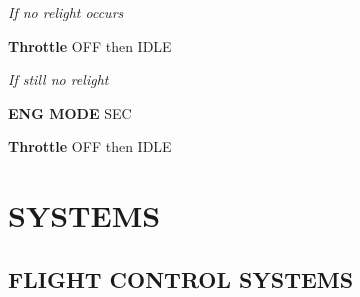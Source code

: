 \documentclass[fontSpartan]{TechCheck}
\begin{document}
\begin{longtableitemize}
{		\emph{If no relight occurs}
		\begin{subenumerate}[start=4]
			\item \textbf{Throttle} \dotfill OFF then IDLE
		\end{subenumerate}

		\emph{If still no relight}
		\begin{subenumerate}[start=5]
			\item \textbf{ENG MODE} \dotfill SEC
			\item \textbf{Throttle} \dotfill OFF then IDLE
		\end{subenumerate}}
	\end{longtableitemize}

	\cleardoublepage

	\chapter{SYSTEMS}
	\minitoc
	\cleardoublepage

	\section{FLIGHT CONTROL SYSTEMS}
	\thumbnar
\end{document}
